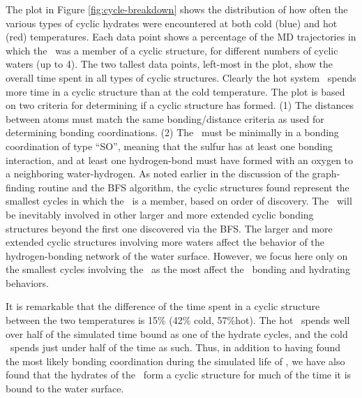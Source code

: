 The plot in Figure \ref{fig:cycle-breakdown} shows the distribution of how often the various types of cyclic hydrates were encountered at both cold (blue) and hot (red) temperatures. Each data point shows a percentage of the MD trajectories in which the \suldiox~was a member of a cyclic structure, for different numbers of cyclic waters (up to 4). The two tallest data points, left-most in the plot, show the overall time spent in all types of cyclic structures. Clearly the hot system \suldiox~spends more time in a cyclic structure than at the cold temperature. The plot is based on two criteria for determining if a cyclic structure has formed. (1) The distances between atoms must match the same bonding/distance criteria as used for determining bonding coordinations. (2) The \suldiox~must be minimally in a bonding coordination of type ``SO'', meaning that the sulfur has at least one bonding interaction, and at least one hydrogen-bond must have formed with an oxygen to a neighboring water-hydrogen. As noted earlier in the discussion of the graph-finding routine and the BFS algorithm, the cyclic structures found represent the smallest cycles in which the \suldiox~is a member, based on order of discovery. The \suldiox~will be inevitably involved in other larger and more extended cyclic bonding structures beyond the first one discovered via the BFS. The larger and more extended cyclic structures involving more waters affect the behavior of the hydrogen-bonding network of the water surface. However, we focus here only on the smallest cycles involving the \suldiox~as the most affect the \suldiox~bonding and hydrating behaviors.

It is remarkable that the difference of the time spent in a cyclic structure between the two temperatures is 15\% (42\% cold, 57\%hot). The hot \suldiox~spends well over half of the simulated time bound as one of the hydrate cycles, and the cold \suldiox~spends just under half of the time as such. Thus, in addition to having found the most likely bonding coordination during the simulated life of \suldiox, we have also found that the hydrates of the \suldiox~form a cyclic structure for much of the time it is bound to the water surface.

